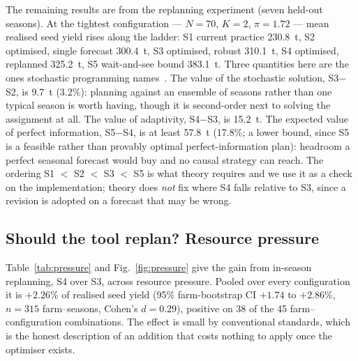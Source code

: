 \documentclass[10pt,twocolumn]{article}
\begin{document}
The remaining results are from the replanning experiment (seven held-out
seasons). At the tightest configuration --- $N = 70$,
$K = 2$, $\pi = 1.72$ --- mean realised
seed yield rises along the ladder:
S1 current practice 230.8~t, S2 optimised, single forecast 300.4~t, S3 optimised, robust 310.1~t, S4 optimised, replanned 325.2~t, S5 wait-and-see bound 383.1~t.
Three quantities here are the ones stochastic programming
names~\cite{birge}. The value of the stochastic solution, S3$-$S2, is
9.7~t (3.2\%): planning against an
ensemble of seasons rather than one typical season is worth having,
though it is second-order next to solving the assignment at all. The
value of adaptivity, S4$-$S3, is 15.2~t. The expected value of
perfect information, S5$-$S4, is at least 57.8~t
(17.8\%; a lower bound, since S5 is a feasible
rather than provably optimal perfect-information plan): headroom a
perfect seasonal forecast would buy and no causal strategy can reach.
The ordering
S1 $<$ S2 $<$ S3 $<$ S5 is what theory requires and we use it as a
check on the implementation; theory does \emph{not} fix where S4
falls relative to S3, since a revision is adopted on a forecast that
may be wrong.

\subsection{Should the tool replan? Resource pressure}

Table~\ref{tab:pressure} and Fig.~\ref{fig:pressure} give the gain
from in-season replanning, S4 over S3, across resource pressure.
Pooled over every configuration it is
$+2.26$\% of realised seed yield (95\% farm-bootstrap
CI $+1.74$ to $+2.86$\%, $n = 315$
farm--seasons, Cohen's $d = 0.29$), positive on
38 of the 45 farm--configuration combinations.
The effect is small by conventional standards, which is the honest
description of an addition that costs nothing to apply once the
optimiser exists.
\end{document}
